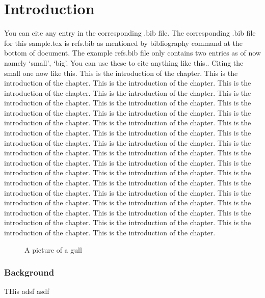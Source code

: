 \documentclass{nithreport}
\begin{document}
\chapter{Introduction}
You can cite any entry in the corresponding .bib file. The corresponding .bib file for this sample.tex is refs.bib as mentioned by bibliography command at the bottom of document. The example refs.bib file only contains two entries as of now namely `small', `big'. You can use these to cite anything like this.\cite{big}. Citing the small one now like this\cite{small}.
This is the introduction of the chapter. This is the introduction of the chapter. This is the introduction of the chapter. This is the introduction of the chapter. This is the introduction of the chapter. This is the introduction of the chapter. This is the introduction of the chapter. This is the introduction of the chapter. This is the introduction of the chapter. This is the introduction of the chapter. This is the introduction of the chapter. This is the introduction of the chapter. This is the introduction of the chapter.\cite{big} This is the introduction of the chapter. This is the introduction of the chapter. This is the introduction of the chapter. This is the introduction of the chapter. This is the introduction of the chapter. This is the introduction of the chapter. This is the introduction of the chapter. This is the introduction of the chapter. This is the introduction of the chapter. This is the introduction of the chapter. This is the introduction of the chapter. This is the introduction of the chapter. This is the introduction of the chapter. This is the introduction of the chapter. This is the introduction of the chapter. This is the introduction of the chapter. This is the introduction of the chapter. This is the introduction of the chapter. This is the introduction of the chapter. This is the introduction of the chapter.

\begin{figure}
  \caption{A picture of a gull}
\end{figure}

\subsection{Background}
THis adsf asdf 
\end{document}
